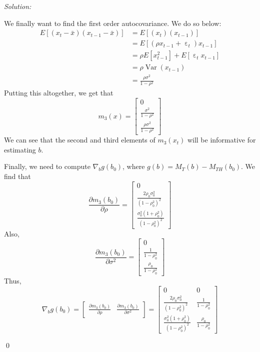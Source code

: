 \documentclass[12pt]{article}
\DeclareMathOperator*{\Var}{\text{Var}}
\DeclareMathOperator{\eps}{\varepsilon}
\newenvironment{problem}[2][Problem]{\begin{trivlist}
\item[\hskip \labelsep {\bfseries #1}\hskip \labelsep {\bfseries #2.}]}{\end{trivlist}}
\newenvironment{sol}
    {\emph{Solution:}
    }
    {
    \qed
    }
\begin{document}
\begin{sol}
    We finally want to find the first order autocovariance. We do so below:
    \begin{align*}
        E[(x_t - \bar{x})(x_{t-1} - \bar{x})] &= E[(x_t )(x_{t-1})]\\
        &= E[(\rho x_{t-1} + \eps_t)x_{t-1}]\\
        &= \rho E[x_{t-1}^2] + E[\eps_t x_{t-1}]\\
        &= \rho \Var(x_{t-1})\\
        &= \frac{\rho \sigma^2}{1 - \rho^2}
    \end{align*}
    Putting this altogether, we get that
    \[m_3(x) = \begin{bmatrix} 0 \\\frac{\sigma^2}{1-\rho^2}\\\frac{\rho \sigma^2}{1 - \rho^2}\end{bmatrix}\]
    We can see that the second and third elements of $m_3(x_t)$ will be informative for estimating $b$. 

    Finally, we need to compute $\nabla_b g(b_0)$, where $g(b) = M_T(b) - M_{TH}(b_0)$. We find that
    \[\frac{\partial m_3(b_0)}{\partial \rho} = \begin{bmatrix} 0\\\frac{2\rho_0 \sigma_0^2}{(1-\rho_0^2)^2}\\ \frac{\sigma_0^2 (1 + \rho_0^2)}{(1 - \rho_0^2)^2}\end{bmatrix}\]
    Also,
    \[\frac{\partial m_3(b_0)}{\partial \sigma^2} = \begin{bmatrix} 0\\\frac{1}{1-\rho_0^2}\\\frac{\rho_0}{1-\rho_0^2}\end{bmatrix}\]
    Thus,
    \[\nabla_b g(b_0) = \begin{bmatrix}\frac{\partial m_3(b_0)}{\partial \rho} & \frac{\partial m_3(b_0)}{\partial \sigma^2}  \end{bmatrix} = \begin{bmatrix}0 & 0 \\\frac{2\rho_0 \sigma_0^2}{(1-\rho_0^2)^2} &\frac{1}{1-\rho_0^2} \\ \frac{\sigma_0^2 (1 + \rho_0^2)}{(1 - \rho_0^2)^2} & \frac{\rho_0}{1-\rho_0^2}\end{bmatrix}\]
\end{sol}
\begin{problem}{2}
\end{problem}
\end{document}
